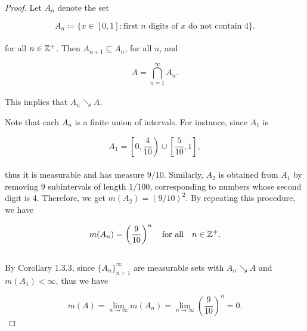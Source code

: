 \documentclass[12pt, a4paper, openany, twoside]{book}
\theoremstyle{definition}
\theoremstyle{remark}
\theoremstyle{plain}
\numberwithin{equation}{section}
\begin{document}
\begin{proof}
    Let $A_n$ denote the set 

    \[A_n\coloneqq\{x\in [0,1]:\text{first $n$ digits of $x$ do not contain 4}\}.\]
    \\
    for all $n\in{\mathbb {Z}}^+$. Then $A_{n+1}\subseteq A_n$, for all $n$, and 

    \[A=\bigcap_{n=1}^{\infty}{A_n}.\]
    \\
    This implies that $A_n\searrow A$.

    Note that each $A_n$ is a finite union of intervals. For instance, since $A_1$ is 

    \[A_1=\left[0,\frac{4}{10}\right)\cup\left[\frac{5}{10},1\right],\]
    \\
    thus it is measurable and has measure $9/10$. Similarly, $A_2$ is obtained from $A_1$ by removing 9 subintervals of length $1/100$, corresponding to numbers whose second digit is 4. Therefore, we get $m(A_2)=\left(9/10\right)^2$. By repeating this procedure, we have
    
    \[m(A_n)=\left(\frac{9}{10}\right)^n\quad\text{for all}\quad n\in{\mathbb {Z}}^+.\]
    \\
    By Corollary 1.3.3, since $\{A_n\}_{n=1}^{\infty}$ are measurable sets with $A_n\searrow A$ and $m(A_1)<\infty$, thus we have
    
    \[m(A)=\lim_{n\rightarrow\infty}{m(A_n)}=\lim_{n\rightarrow\infty}{\left(\frac{9}{10}\right)^n}=0.\]
\end{proof}

\newpage
\end{document}
